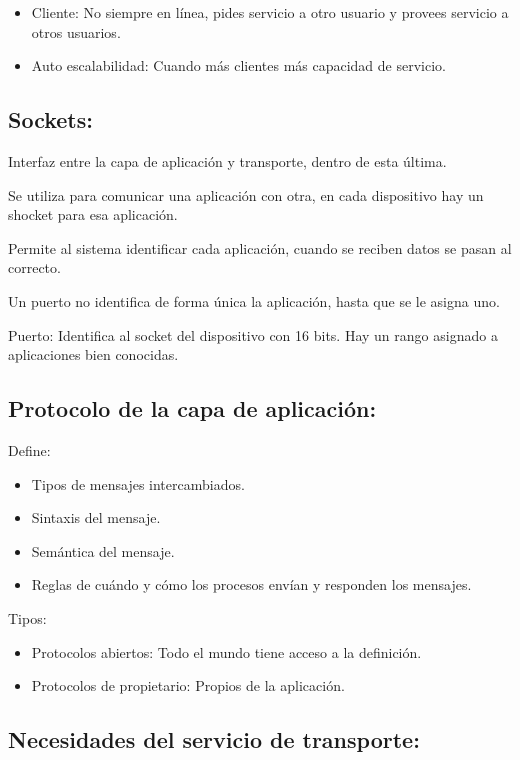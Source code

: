 \documentclass[12pt, twoside, openright]{report} %
\begin{document}
\begin{itemize}
	\item Cliente: No siempre en línea, pides servicio a otro usuario y
	      provees servicio a otros usuarios.
	\item Auto escalabilidad: Cuando más clientes más capacidad de servicio.
\end{itemize}

\subsection{Sockets:}


Interfaz entre la capa de aplicación y transporte, dentro de esta
última.

Se utiliza para comunicar una aplicación con otra, en cada
dispositivo hay un shocket para esa aplicación.

Permite al sistema identificar cada aplicación, cuando se reciben
datos se pasan al correcto.

Un puerto no identifica de forma única la aplicación, hasta que se
le asigna uno.

Puerto: Identifica al socket del dispositivo con 16 bits. Hay un
rango asignado a aplicaciones bien conocidas.

\subsection{Protocolo de la capa de aplicación:}

Define:

\begin{itemize}
	\item Tipos de mensajes intercambiados.
	\item Sintaxis del mensaje.
	\item Semántica del mensaje.
	\item Reglas de cuándo y cómo los procesos envían y responden los
	      mensajes.
\end{itemize}

Tipos:

\begin{itemize}
	\item Protocolos abiertos: Todo el mundo tiene acceso a la definición.
	\item Protocolos de propietario: Propios de la aplicación.
\end{itemize}


\subsection{Necesidades del servicio de transporte:}
\end{document}
